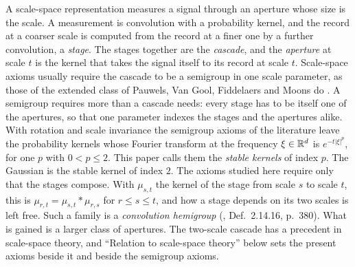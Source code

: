 A scale-space representation measures a signal through an aperture whose size is the scale. A
measurement is convolution with a probability kernel, and the record at a coarser scale is
computed from the record at a finer one by a further convolution, a \emph{stage}. The stages
together are the \emph{cascade}, and the \emph{aperture} at scale $t$ is the kernel that takes
the signal itself to its record at scale $t$.
Scale-space axioms usually require the cascade to be a semigroup in one scale parameter, as those of
the extended class of Pauwels, Van Gool, Fiddelaers and Moons do . A
semigroup requires more than a cascade needs: every stage has to be itself one of the apertures, so
that one parameter indexes the stages and the apertures alike. With rotation and scale
invariance the semigroup axioms of the literature leave the probability kernels whose Fourier
transform at the frequency $\xi \in \mathbb{R}^d$ is $e^{-t|\xi|^p}$, for one $p$ with $0 < p \le 2$.
This paper calls them the \emph{stable kernels} of index $p$. The Gaussian is the stable kernel
of index $2$. The axioms studied here require only that the stages compose. With
$\mu_{s,t}$ the kernel of the stage from scale $s$ to scale $t$, this is
$\mu_{r,t} = \mu_{s,t} * \mu_{r,s}$ for $r \le s \le t$, and how a stage depends on its two
scales is left free. Such a family is a \emph{convolution hemigroup}
(, Def.~2.14.16, p.~380). What is gained is a larger class of
apertures. The two-scale cascade has a precedent in scale-space theory, and ``Relation to
scale-space theory'' below sets the present axioms beside it and beside the semigroup axioms.

